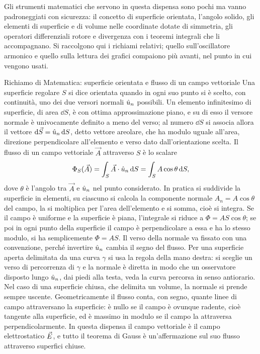 \documentclass[11pt,a4paper]{article}
\begin{document}
Gli strumenti matematici che servono in questa dispensa sono pochi ma vanno padroneggiati con sicurezza: il concetto di superficie orientata, l'angolo solido, gli elementi di superficie e di volume nelle coordinate dotate di simmetria, gli operatori differenziali rotore e divergenza con i teoremi integrali che li accompagnano. Si raccolgono qui i richiami relativi; quello sull'oscillatore armonico e quello sulla lettura dei grafici compaiono più avanti, nel punto in cui vengono usati.

\begin{riquadro}[label=ric:gauss:superfici]{Richiamo di Matematica: superficie orientata e flusso di un campo vettoriale}
Una superficie regolare $S$ si dice orientata quando in ogni suo punto si è scelto, con continuità, uno dei due versori normali $\hat{u}_n$ possibili. Un elemento infinitesimo di superficie, di area $\dd S$, è con ottima approssimazione piano, e su di esso il versore normale è univocamente definito a meno del verso; al numero $\dd S$ si associa allora il vettore $\mathrm{d}\vec{S}=\hat{u}_n\,\mathrm{d} S$, detto vettore areolare, che ha modulo uguale all'area, direzione perpendicolare all'elemento e verso dato dall'orientazione scelta. Il flusso di un campo vettoriale $\vec{A}$ attraverso $S$ è lo scalare
\[
\Phi_S(\vec{A})=\int_S \vec{A}\cdot\hat{u}_n\,\mathrm{d} S=\int_S A\cos\theta\,\mathrm{d} S ,
\]
dove $\theta$ è l'angolo tra $\vec{A}$ e $\hat{u}_n$ nel punto considerato. In pratica si suddivide la superficie in elementi, su ciascuno si calcola la componente normale $A_n=A\cos\theta$ del campo, la si moltiplica per l'area dell'elemento e si somma, cioè si integra. Se il campo è uniforme e la superficie è piana, l'integrale si riduce a $\Phi=AS\cos\theta$; se poi in ogni punto della superficie il campo è perpendicolare a essa e ha lo stesso modulo, si ha semplicemente $\Phi=AS$. Il verso della normale va fissato con una convenzione, perché invertire $\hat{u}_n$ cambia il segno del flusso. Per una superficie aperta delimitata da una curva $\gamma$ si usa la regola della mano destra: si sceglie un verso di percorrenza di $\gamma$ e la normale è diretta in modo che un osservatore disposto lungo $\hat{u}_n$, dai piedi alla testa, veda la curva percorsa in senso antiorario. Nel caso di una superficie chiusa, che delimita un volume, la normale si prende sempre uscente. Geometricamente il flusso conta, con segno, quante linee di campo attraversano la superficie: è nullo se il campo è ovunque radente, cioè tangente alla superficie, ed è massimo in modulo se il campo la attraversa perpendicolarmente. In questa dispensa il campo vettoriale è il campo elettrostatico $\vec{E}$, e tutto il teorema di Gauss è un'affermazione sul suo flusso attraverso superfici chiuse.
\end{riquadro}
\end{document}
